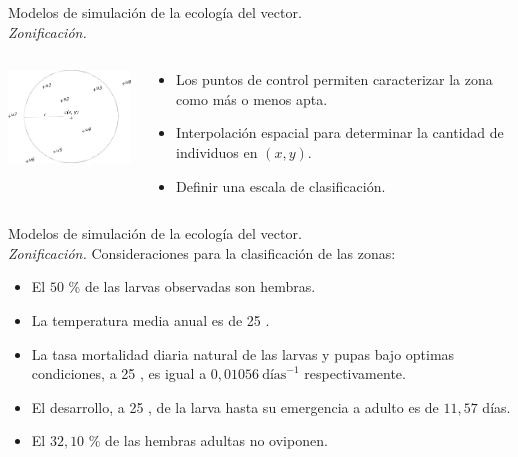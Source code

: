 \begin{frame}[c]{Modelos de simulación de la ecología del vector.\\\textit{Zonificación.}}
  \begin{center}
   \begin{columns}[T]
        \begin{column}[T]{4cm}
            \includegraphics[width=4.5cm]{../book/capitulo-4/graphics/zonificacion.png}
        \end{column}
        \begin{column}[T]{7cm}
          \begin{itemize}
          \item Los puntos de control permiten caracterizar la zona como más o menos apta.
          \item Interpolación espacial para determinar la cantidad de individuos en $(x, y)$.
          \item Definir una escala de clasificación.
          \end{itemize}
        \end{column}
    \end{columns}
  \end{center}
\end{frame}

\begin{frame}[c]{Modelos de simulación de la ecología del vector.\\\textit{Zonificación.}}
  Consideraciones para la clasificación de las zonas:
  \begin{itemize}
      \item El $50$ \% de las larvas observadas son hembras.
      \item La temperatura media anual es de 25 \textcelsius.
      \item La tasa mortalidad diaria natural de las larvas y pupas bajo optimas condiciones, a 25 \textcelsius, es igual a $0,01056\ \text{días}^{-1}$ respectivamente.
      \item El desarrollo, a 25 \textcelsius, de la larva hasta su emergencia a adulto es de $11,57$ días.
      \item El $32,10$ \% de las hembras adultas no oviponen.
  \end{itemize}
\end{frame}

